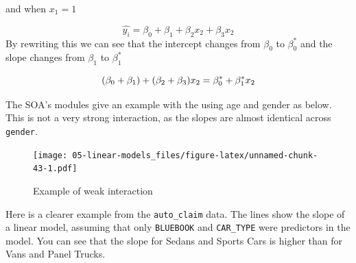 \documentclass[openany]{book}
\newenvironment{Shaded}{\begin{snugshade}}{\end{snugshade}}
\newcommand{\DataTypeTok}[1]{\textcolor[rgb]{0.13,0.29,0.53}{#1}}
\newcommand{\FloatTok}[1]{\textcolor[rgb]{0.00,0.00,0.81}{#1}}
\newcommand{\KeywordTok}[1]{\textcolor[rgb]{0.13,0.29,0.53}{\textbf{#1}}}
\newcommand{\NormalTok}[1]{#1}
\newcommand{\OperatorTok}[1]{\textcolor[rgb]{0.81,0.36,0.00}{\textbf{#1}}}
\newcommand{\StringTok}[1]{\textcolor[rgb]{0.31,0.60,0.02}{#1}}
\begin{document}
and when \(x_1 = 1\)

\[\hat{y_i} = \beta_0 + \beta_1 + \beta_2 x_2 + \beta_3 x_2\]
By rewriting this we can see that the intercept changes from \(\beta_0\) to \(\beta_0^*\) and the slope changes from \(\beta_1\) to \(\beta_1^*\)

\[
(\beta_0 + \beta_1) + (\beta_2 + \beta_3 ) x_2 \\
 = \beta_0^* + \beta_1^* x_2
\]

The SOA's modules give an example with the using age and gender as below. This is not a very strong interaction, as the slopes are almost identical across \texttt{gender}.

\begin{Shaded}
\end{Shaded}

\begin{figure}
\centering
\texttt{[image: 05-linear-models\_files/figure-latex/unnamed-chunk-43-1.pdf]}
\caption{\label{fig:unnamed-chunk-43}Example of weak interaction}
\end{figure}

Here is a clearer example from the \texttt{auto\_claim} data. The lines show the slope of a linear model, assuming that only \texttt{BLUEBOOK} and \texttt{CAR\_TYPE} were predictors in the model. You can see that the slope for Sedans and Sports Cars is higher than for Vans and Panel Trucks.

\begin{Shaded}
\end{Shaded}
\end{document}
